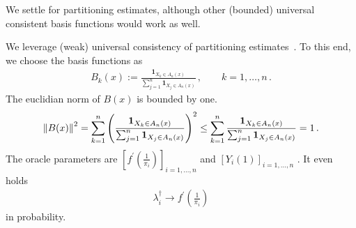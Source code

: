 We settle for partitioning estimates, 
although other (bounded) universal consistent basis functions
would work as well.

We leverage (weak) universal consistency
of partitioning estimates~\cite{Gyorfi2002}.
To this end, we choose the basis functions as
\begin{gather*}
  B_k(x)
  :=
  \frac{
  \mathbf{1}_{X_k \in A_n(x)}
  }{
  \sum_{j=1}^{n} 
  \mathbf{1}_{X_j \in A_n(x)}
  }
  \,,
  \qquad
  k=
  1,\ldots,n
  \,.
\end{gather*}
The euclidian norm of 
$
  B(x)
$
is bounded by one.
\begin{gather*}
  \left\lVert B(x)\right\rVert^2
  =
  \sum_{k=1}^{n} 
  \left( 
  \frac{
  \mathbf{1}_{X_k \in A_n(x)}
  }{
  \sum_{j=1}^{n} 
  \mathbf{1}_{X_j \in A_n(x)}
  }
  \right)
  ^2
  \le
  \sum_{k=1}^{n} 
  \frac{
  \mathbf{1}_{X_k \in A_n(x)}
  }{
  \sum_{j=1}^{n} 
  \mathbf{1}_{X_j \in A_n(x)}
  }
  =1
  \,.
\end{gather*}
The oracle parameters are
$
  \left[ 
    f^{'}
    \left( 
      \frac{1}{\pi_i}
    \right)
  \right] _ { i = 1,\ldots,n }
$
and
$
  \left[ 
    Y_i(1)
  \right] _ { i = 1,\ldots,n }
$
.
It even holds
\begin{gather*}
  \lambda ^ \dagger _ i \to 
    f^{'}
    \left( 
      \frac{1}{\pi_i}
    \right)
\end{gather*}
in probability.

